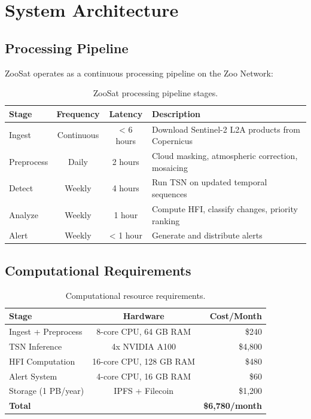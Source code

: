\section{System Architecture}

\label{sec:architecture}

\subsection{Processing Pipeline}

ZooSat operates as a continuous processing pipeline on the Zoo Network:

\begin{table}[H]
\centering
\caption{ZooSat processing pipeline stages.}
\label{tab:pipeline}
\begin{tabularx}{\textwidth}{@{}lccX@{}}
\toprule
\textbf{Stage} & \textbf{Frequency} & \textbf{Latency} & \textbf{Description} \\
\midrule
Ingest & Continuous & < 6 hours & Download Sentinel-2 L2A products from Copernicus \\
Preprocess & Daily & 2 hours & Cloud masking, atmospheric correction, mosaicing \\
Detect & Weekly & 4 hours & Run TSN on updated temporal sequences \\
Analyze & Weekly & 1 hour & Compute HFI, classify changes, priority ranking \\
Alert & Weekly & < 1 hour & Generate and distribute alerts \\
\bottomrule
\end{tabularx}
\end{table}

\subsection{Computational Requirements}

\begin{table}[H]
\centering
\caption{Computational resource requirements.}
\label{tab:compute}
\begin{tabular}{@{}lcr@{}}
\toprule
\textbf{Stage} & \textbf{Hardware} & \textbf{Cost/Month} \\
\midrule
Ingest + Preprocess & 8-core CPU, 64 GB RAM & \$240 \\
TSN Inference & 4x NVIDIA A100 & \$4,800 \\
HFI Computation & 16-core CPU, 128 GB RAM & \$480 \\
Alert System & 4-core CPU, 16 GB RAM & \$60 \\
Storage (1 PB/year) & IPFS + Filecoin & \$1,200 \\
\midrule
\textbf{Total} & & \textbf{\$6,780/month} \\
\bottomrule
\end{tabular}
\end{table}

